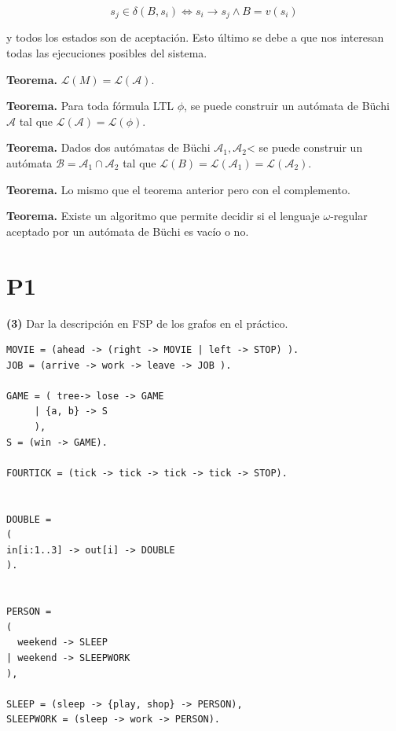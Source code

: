 \documentclass[a4paper, 12pt]{article}
\begin{document}
\begin{equation*}
    s_j \in \delta(B, s_i) \iff s_i \to s_j \land B = v(s_i)
\end{equation*}

y todos los estados son de aceptación. Esto último se debe a que nos interesan
todas las ejecuciones posibles del sistema.

\textbf{Teorema.} $\mathcal{L}(M) = \mathcal{L}(\mathcal{A})$.

\textbf{Teorema.} Para toda fórmula LTL $\phi$, se puede construir un autómata 
de Büchi $\mathcal{A}$ tal que $\mathcal{L}(\mathcal{A}) = \mathcal{L}(\phi)$.

\textbf{Teorema.} Dados dos autómatas de Büchi $\mathcal{A}_1, \mathcal{A}_2$<
se puede construir un autómata $\mathcal{B} = \mathcal{A}_1 \cap \mathcal{A}_2$ tal que 
$\mathcal{L}(B) = \mathcal{L}(\mathcal{A}_1) = \mathcal{L}(\mathcal{A}_2)$.

\textbf{Teorema.} Lo mismo que el teorema anterior pero con el complemento. 

\textbf{Teorema.} Existe un algoritmo que permite decidir si el lenguaje
$\omega$-regular aceptado por un autómata de Büchi es vacío o no.




























\pagebreak 
\section{P1}

\begin{myframe}
    \textbf{(3)} Dar la descripción en FSP de los grafos en el práctico.
\end{myframe}

\begin{verbatim}
MOVIE = (ahead -> (right -> MOVIE | left -> STOP) ).
JOB = (arrive -> work -> leave -> JOB ).

GAME = ( tree-> lose -> GAME 
     | {a, b} -> S
     ),
S = (win -> GAME).

FOURTICK = (tick -> tick -> tick -> tick -> STOP).


DOUBLE = 
(
in[i:1..3] -> out[i] -> DOUBLE
).


PERSON = 
(
  weekend -> SLEEP
| weekend -> SLEEPWORK
),

SLEEP = (sleep -> {play, shop} -> PERSON),
SLEEPWORK = (sleep -> work -> PERSON).
\end{verbatim}
\end{document}
